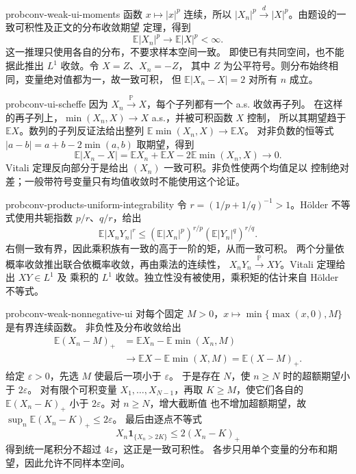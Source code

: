 \begin{solution}{probconv-weak-ui-moments}
函数 $x\mapsto|x|^p$ 连续，所以
$|X_n|^p\xrightarrow d|X|^p$。由题设的一致可积性及正文的分布收敛期望
定理，得到
\[
 \mathbb E|X_n|^p\longrightarrow\mathbb E|X|^p<\infty.
\]
这一推理只使用各自的分布，不要求样本空间一致。
即使已有共同空间，也不能据此推出 $L^1$ 收敛。令 $X=Z$、$X_n=-Z$，
其中 $Z$ 为公平符号。则分布始终相同，变量绝对值都为一，故一致可积，
但 $\mathbb E|X_n-X|=2$ 对所有 $n$ 成立。
\end{solution}

\begin{solution}{probconv-ui-scheffe}
因为 $X_n\xrightarrow{\mathbb P}X$，每个子列都有一个 a.s. 收敛再子列。
在这样的再子列上，$\min(X_n,X)\to X$ a.s.，并被可积函数 $X$ 控制，
所以其期望趋于 $\mathbb E X$。数列的子列反证法给出整列
$\mathbb E\min(X_n,X)\to\mathbb E X$。
对非负数的恒等式 $|a-b|=a+b-2\min(a,b)$ 取期望，得到
\[
 \mathbb E|X_n-X|
 =\mathbb E X_n+\mathbb E X-2\mathbb E\min(X_n,X)\longrightarrow0.
\]
Vitali 定理反向部分于是给出 $(X_n)$ 一致可积。非负性使两个均值足以
控制绝对差；一般带符号变量只有均值收敛时不能使用这个论证。
\end{solution}

\begin{solution}{probconv-products-uniform-integrability}
令 $r=(1/p+1/q)^{-1}>1$。Hölder 不等式使用共轭指数 $p/r$、$q/r$，给出
\[
 \mathbb E|X_nY_n|^r
 \le(\mathbb E|X_n|^p)^{r/p}(\mathbb E|Y_n|^q)^{r/q}.
\]
右侧一致有界，因此乘积族有一致的高于一阶的矩，从而一致可积。
两个分量依概率收敛推出联合依概率收敛，再由乘法的连续性，
$X_nY_n\xrightarrow{\mathbb P}XY$。Vitali 定理给出 $XY\in L^1$ 及
乘积的 $L^1$ 收敛。独立性没有被使用，乘积矩的估计来自 Hölder 不等式。
\end{solution}

\begin{solution}{probconv-weak-nonnegative-ui}
对每个固定 $M>0$，$x\mapsto\min\{\max(x,0),M\}$ 是有界连续函数。
非负性及分布收敛给出
\begin{align*}
 \mathbb E(X_n-M)_+
 &=\mathbb E X_n-\mathbb E\min(X_n,M)\\
 &\longrightarrow\mathbb E X-\mathbb E\min(X,M)
 =\mathbb E(X-M)_+.
\end{align*}
给定 $\varepsilon>0$，先选 $M$ 使最后一项小于 $\varepsilon$。
于是存在 $N$，使 $n\ge N$ 时的超额期望小于 $2\varepsilon$。
对有限个可积变量 $X_1,\ldots,X_{N-1}$，再取 $K\ge M$，使它们各自的
$\mathbb E(X_n-K)_+$ 小于 $2\varepsilon$。对 $n\ge N$，增大截断值
也不增加超额期望，故
$\sup_n\mathbb E(X_n-K)_+\le2\varepsilon$。
最后由逐点不等式
\[
 X_n\mathbf1_{\{X_n>2K\}}\le2(X_n-K)_+
\]
得到统一尾积分不超过 $4\varepsilon$，这正是一致可积性。
各步只用单个变量的分布和期望，因此允许不同样本空间。
\end{solution}
